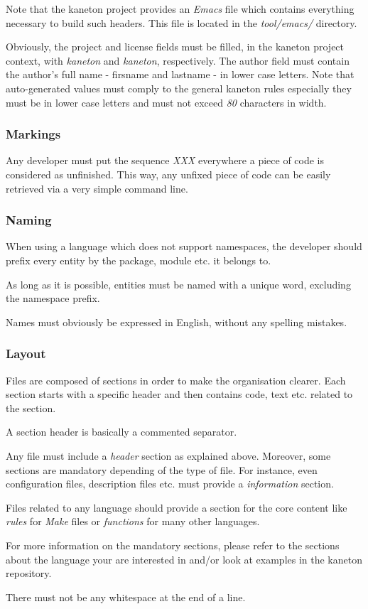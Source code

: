 Note that the kaneton project provides an \textit{Emacs} file which contains
everything necessary to build such headers. This file is located in the
\textit{tool/emacs/} directory.

Obviously, the project and license fields must be filled, in the kaneton
project context, with \textit{kaneton} and \textit{kaneton}, respectively. The
author field must contain the author's full name - firsname and lastname -
in lower case letters. Note that auto-generated values must comply to
the general kaneton rules especially they must be in lower case letters and
must not exceed \textit{80} characters in width.


\subsubsection{Markings}

Any developer must put the sequence \textit{XXX} everywhere a piece of code
is considered as unfinished. This way, any unfixed piece of code can be
easily retrieved via a very simple command line.


\subsubsection{Naming}

When using a language which does not support namespaces, the developer should
prefix every entity by the package, module etc. it belongs to.

As long as it is possible, entities must be named with a unique word, excluding
the namespace prefix.

Names must obviously be expressed in English, without any spelling mistakes.


\subsubsection{Layout}

Files are composed of sections in order to make the organisation clearer.
Each section starts with a specific header and then contains code, text etc.
related to the section.

A section header is basically a commented separator.

Any file must include a \textit{header} section as explained above. Moreover,
some sections are mandatory depending of the type of file. For instance,
even configuration files, description files etc. must provide a
\textit{information} section.

Files related to any language should provide a section for the core
content like \textit{rules} for \textit{Make} files or \textit{functions}
for many other languages.

For more information on the mandatory sections, please refer to
the sections about the language your are interested in and/or look at
examples in the kaneton repository.

There must not be any whitespace at the end of a line.
